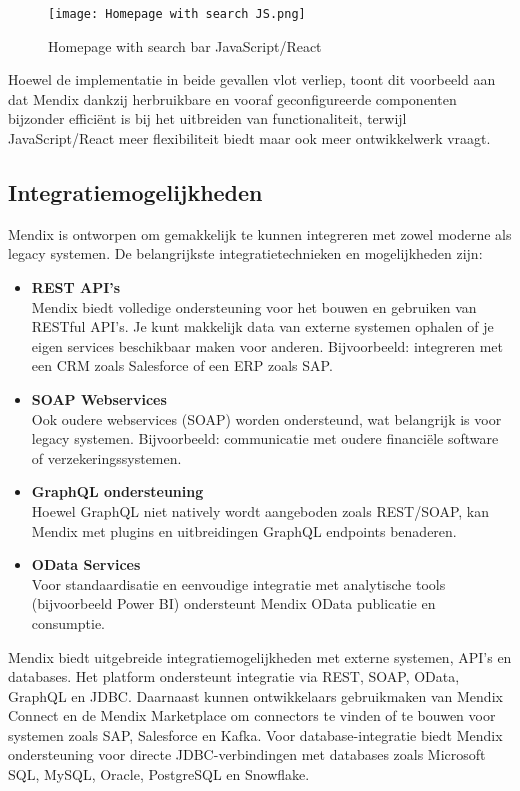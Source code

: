 \begin{figure}[H]
    \centering
    \texttt{[image: Homepage with search JS.png]}
    \caption[\centering Homepage with search bar JavaScript/React]{\label{fig:homepage-with-search-JS} Homepage with search bar JavaScript/React}
\end{figure}


 Hoewel de implementatie in beide gevallen vlot verliep, toont dit voorbeeld aan dat Mendix dankzij herbruikbare en vooraf geconfigureerde componenten bijzonder efficiënt is bij het uitbreiden van functionaliteit, terwijl JavaScript/React meer flexibiliteit biedt maar ook meer ontwikkelwerk vraagt.


\subsection{Integratiemogelijkheden}
Mendix is ontworpen om gemakkelijk te kunnen integreren met zowel moderne als legacy systemen. De belangrijkste integratietechnieken en mogelijkheden zijn:
\begin{itemize}
    \item \textbf{REST \gls{API}'s}
    \\
    Mendix biedt volledige ondersteuning voor het bouwen en gebruiken van RESTful \gls{API}'s. Je kunt makkelijk data van externe systemen ophalen of je eigen services beschikbaar maken voor anderen.
    Bijvoorbeeld: integreren met een CRM zoals Salesforce of een ERP zoals SAP.
    \item \textbf{SOAP Webservices}
    \\
    Ook oudere webservices (SOAP) worden ondersteund, wat belangrijk is voor legacy systemen.
    Bijvoorbeeld: communicatie met oudere financiële software of verzekeringssystemen.
    \item \textbf{GraphQL ondersteuning}
    \\
    Hoewel GraphQL niet natively wordt aangeboden zoals REST/SOAP, kan Mendix met plugins en uitbreidingen GraphQL endpoints benaderen.
    \item \textbf{OData Services}
    \\
    Voor standaardisatie en eenvoudige integratie met analytische tools (bijvoorbeeld Power BI) ondersteunt Mendix OData publicatie en consumptie.
\end{itemize}
Mendix biedt uitgebreide integratiemogelijkheden met externe systemen, \gls{API}’s en databases. Het platform ondersteunt integratie via REST, SOAP, OData, GraphQL en JDBC. Daarnaast kunnen ontwikkelaars gebruikmaken van Mendix Connect en de Mendix Marketplace om connectors te vinden of te bouwen voor systemen zoals SAP, Salesforce en Kafka. Voor database-integratie biedt Mendix ondersteuning voor directe JDBC-verbindingen met databases zoals Microsoft SQL, MySQL, Oracle, PostgreSQL en Snowflake.


